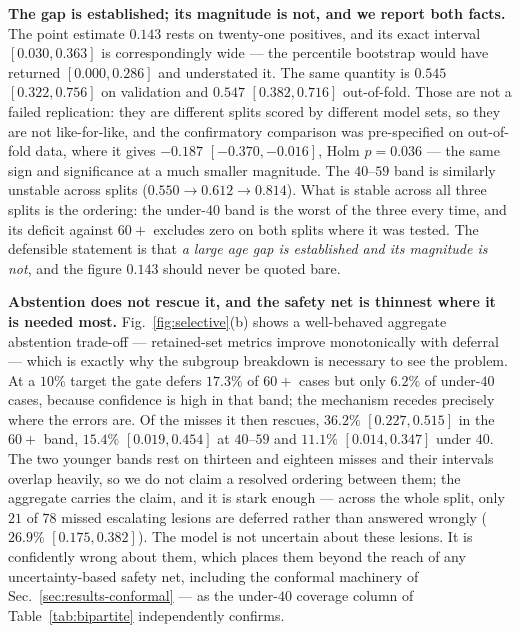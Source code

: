 \documentclass[journal]{IEEEtran}
\begin{document}
\textbf{The gap is established; its magnitude is not, and we report both facts.} The point
estimate $0.143$ rests on twenty-one positives, and its exact interval $[0.030, 0.363]$ is
correspondingly wide --- the percentile bootstrap would have returned $[0.000, 0.286]$ and
understated it. The same quantity is $0.545$ $[0.322, 0.756]$ on validation and $0.547$
$[0.382, 0.716]$ out-of-fold. Those are not a failed replication: they are different splits
scored by different model sets, so they are not like-for-like, and the confirmatory comparison
was pre-specified on out-of-fold data, where it gives $-0.187$ $[-0.370, -0.016]$, Holm
$p=0.036$ --- the same sign and significance at a much smaller magnitude. The $40$--$59$ band
is similarly unstable across splits ($0.550 \rightarrow 0.612 \rightarrow 0.814$). What is
stable across all three splits is the ordering: the under-$40$ band is the worst of the three
every time, and its deficit against $60+$ excludes zero on both splits where it was tested.
The defensible statement is that \emph{a large age gap is established and its magnitude is
not}, and the figure $0.143$ should never be quoted bare.

\textbf{Abstention does not rescue it, and the safety net is thinnest where it is needed most.}
Fig.~\ref{fig:selective}(b) shows a well-behaved aggregate abstention trade-off --- retained-set
metrics improve monotonically with deferral --- which is exactly why the subgroup breakdown is
necessary to see the problem. At a $10\%$ target the gate defers $17.3\%$ of $60+$ cases but
only $6.2\%$ of under-$40$ cases, because confidence is high in that band; the mechanism
recedes precisely where the errors are. Of the misses it then rescues, $36.2\%$ $[0.227,
0.515]$ in the $60+$ band, $15.4\%$ $[0.019, 0.454]$ at $40$--$59$ and $11.1\%$ $[0.014,
0.347]$ under $40$. The two younger bands rest on thirteen and eighteen misses and their
intervals overlap heavily, so we do not claim a resolved ordering between them; the
aggregate carries the claim, and it is stark enough --- across the whole split, only $21$ of
$78$ missed escalating lesions are deferred rather than answered wrongly ($26.9\%$ $[0.175,
0.382]$). The model is not uncertain about these lesions. It is confidently wrong about them,
which places them beyond the reach of any uncertainty-based safety net, including the
conformal machinery of Sec.~\ref{sec:results-conformal} --- as the under-$40$ coverage column
of Table~\ref{tab:bipartite} independently confirms.
\end{document}
